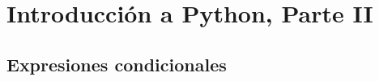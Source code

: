 \documentclass[12pt,xcolor={dvipsnames,x11names},t,table]{beamer}
\begin{document}
% 

% 
% 
% 

% 

% 
% 

\section{Introducción a Python, Parte II}

\subsection{Expresiones condicionales}




% 



\end{document}
